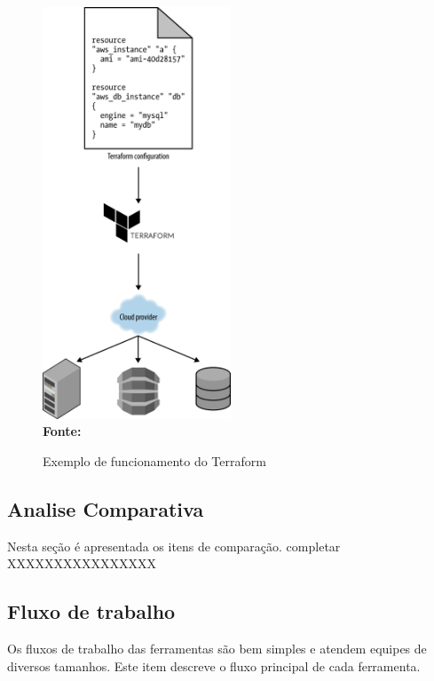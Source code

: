   \begin{figure}[ht]
	\centering	
	\caption[\hspace{0.1cm}Exemplo de funcionamento do Terraform]{Exemplo de funcionamento do Terraform}
	\vspace{-0.4cm}
	\includegraphics[width=0.5\textwidth]{figuras/terraform-working.png}
	 \vspace{-0.2cm}
	\\\textbf{\footnotesize Fonte: \cite{oreilly}}
	\label{fig:figura7}
\end{figure}
\vspace{-0.5cm}


\subsection{ Analise Comparativa }

Nesta seção é apresentada os itens de comparação. completar XXXXXXXXXXXXXXXX

\subsection{Fluxo de trabalho}
Os fluxos de trabalho  das ferramentas são bem simples e atendem equipes de diversos tamanhos. Este item descreve o fluxo principal de cada ferramenta. 

